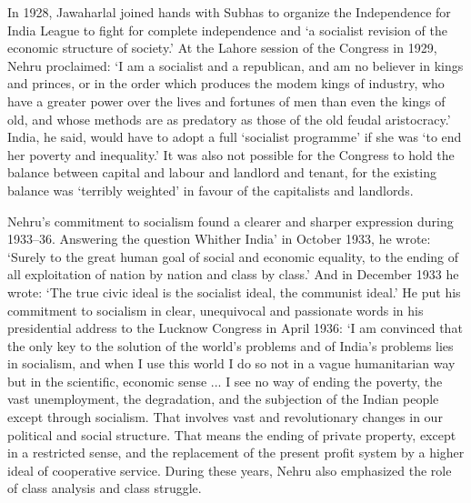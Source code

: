 \begin{multicols}{2}
In 1928, Jawaharlal joined hands with Subhas to organize the Independence for India League to fight for complete independence and `a socialist revision of the economic structure of society.' At the Lahore session of the Congress in 1929, Nehru proclaimed: `I am a socialist and a republican, and am no believer in kings and princes, or in the order which produces the modem kings of industry, who have a greater power over the lives and fortunes of men than even the kings of old, and whose methods are as predatory as those of the old feudal aristocracy.' India, he said, would have to adopt a full `socialist programme' if she was `to end her poverty and inequality.' It was also not possible for the Congress to hold the balance between capital and labour and landlord and tenant, for the existing balance was `terribly weighted' in favour of the capitalists and landlords. 

Nehru's commitment to socialism found a clearer and sharper expression during 1933--36. Answering the question Whither India' in October 1933, he wrote: `Surely to the great human goal of social and economic equality, to the ending of all exploitation of nation by nation and class by class.' And in December 1933 he wrote: `The true civic ideal is the socialist ideal, the communist ideal.' He put his commitment to socialism in clear, unequivocal and passionate words in his presidential address to the Lucknow Congress in April 1936: `I am convinced that the only key to the solution of the world's problems and of India's problems lies in socialism, and when I use this world I do so not in a vague humanitarian way but in the scientific, economic sense ... I see no way of ending the poverty, the vast unemployment, the degradation, and the subjection of the Indian people except through socialism. That involves vast and revolutionary changes in our political and social structure. That means the ending of private property, except in a restricted sense, and the replacement of the present profit system by a higher ideal of cooperative service. During these years, Nehru also emphasized the role of class analysis and class struggle. 


\end{multicols}
